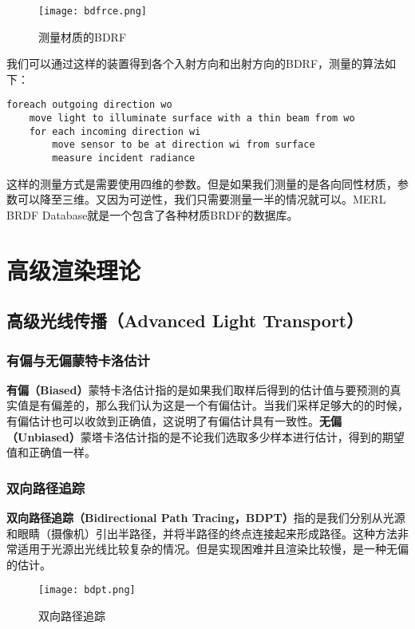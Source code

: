 \documentclass[openany]{progbookcn}
\begin{document}
\begin{figure}[H]
	\centering
	\texttt{[image: bdfrce.png]}
	\caption{测量材质的BDRF}
	\label{fig:bdrfce}
\end{figure}

我们可以通过这样的装置得到各个入射方向和出射方向的BDRF，测量的算法如下：
\begin{lstlisting}[caption=BDRF的测量]
foreach outgoing direction wo
	move light to illuminate surface with a thin beam from wo
	for each incoming direction wi
		move sensor to be at direction wi from surface
		measure incident radiance
\end{lstlisting}

这样的测量方式是需要使用四维的参数。但是如果我们测量的是各向同性材质，参数可以降至三维。又因为可逆性，我们只需要测量一半的情况就可以。MERL BRDF Database就是一个包含了各种材质BRDF的数据库。

\chapter{高级渲染理论}

\section{高级光线传播（Advanced Light Transport）}

\subsection{有偏与无偏蒙特卡洛估计}

\textbf{有偏（Biased）}蒙特卡洛估计指的是如果我们取样后得到的估计值与要预测的真实值是有偏差的，那么我们认为这是一个有偏估计。当我们采样足够大的的时候，有偏估计也可以收敛到正确值，这说明了有偏估计具有一致性。\textbf{无偏（Unbiased）}蒙塔卡洛估计指的是不论我们选取多少样本进行估计，得到的期望值和正确值一样。

\subsection{双向路径追踪}

\textbf{双向路径追踪（Bidirectional Path Tracing，BDPT）}指的是我们分别从光源和眼睛（摄像机）引出半路径，并将半路径的终点连接起来形成路径。这种方法非常适用于光源出光线比较复杂的情况。但是实现困难并且渲染比较慢，是一种无偏的估计。

\begin{figure}[H]
	\centering
	\texttt{[image: bdpt.png]}
	\caption{双向路径追踪}
	\label{fig:bdpt}
\end{figure}
\end{document}
